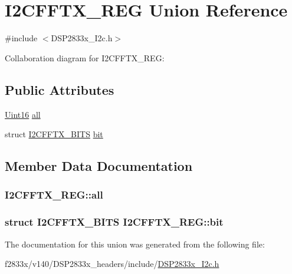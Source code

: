 \hypertarget{union_i2_c_f_f_t_x___r_e_g}{}\section{I2\+C\+F\+F\+T\+X\+\_\+\+R\+E\+G Union Reference}
\label{union_i2_c_f_f_t_x___r_e_g}


{\ttfamily \#include $<$D\+S\+P2833x\+\_\+\+I2c.\+h$>$}



Collaboration diagram for I2\+C\+F\+F\+T\+X\+\_\+\+R\+E\+G\+:
\subsection*{Public Attributes}
\begin{DoxyCompactItemize}
\item 
\hyperlink{_d_s_p2833x___device_8h_a59a9f6be4562c327cbfb4f7e8e18f08b}{Uint16} \hyperlink{union_i2_c_f_f_t_x___r_e_g_a449c30c3a4f919be72ce243603f89a98}{all}
\item 
struct \hyperlink{struct_i2_c_f_f_t_x___b_i_t_s}{I2\+C\+F\+F\+T\+X\+\_\+\+B\+I\+T\+S} \hyperlink{union_i2_c_f_f_t_x___r_e_g_aa11c825e3133999b1865da0d53e7c888}{bit}
\end{DoxyCompactItemize}


\subsection{Member Data Documentation}
\hypertarget{union_i2_c_f_f_t_x___r_e_g_a449c30c3a4f919be72ce243603f89a98}{}
\subsubsection[{all}]{ I2\+C\+F\+F\+T\+X\+\_\+\+R\+E\+G\+::all}\label{union_i2_c_f_f_t_x___r_e_g_a449c30c3a4f919be72ce243603f89a98}
\hypertarget{union_i2_c_f_f_t_x___r_e_g_aa11c825e3133999b1865da0d53e7c888}{}
\subsubsection[{bit}]{\setlength{\rightskip}{0pt plus 5cm}struct {\bf I2\+C\+F\+F\+T\+X\+\_\+\+B\+I\+T\+S} I2\+C\+F\+F\+T\+X\+\_\+\+R\+E\+G\+::bit}\label{union_i2_c_f_f_t_x___r_e_g_aa11c825e3133999b1865da0d53e7c888}


The documentation for this union was generated from the following file\+:\begin{DoxyCompactItemize}
\item 
f2833x/v140/\+D\+S\+P2833x\+\_\+headers/include/\hyperlink{_d_s_p2833x___i2c_8h}{D\+S\+P2833x\+\_\+\+I2c.\+h}\end{DoxyCompactItemize}
